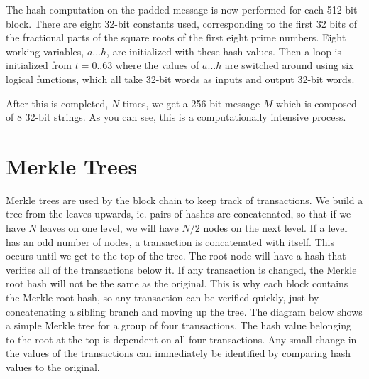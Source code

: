\documentclass[12pt]{article}
\begin{document}
The hash computation on the padded message is now performed for each 512-bit block. There are eight 32-bit constants used, corresponding to the first 32 bits of the fractional parts of the square roots of the first eight prime numbers. Eight working variables, $a...h$, are initialized with these hash values. Then a loop is initialized from $t=0..63$ where the values of $a...h$ are switched around using six logical functions, which all take 32-bit words as inputs and output 32-bit words.

After this is completed, $N$ times, we get a 256-bit message $M$ which is composed of 8 32-bit strings. As you can see, this is a computationally intensive process.

\section{Merkle Trees}
Merkle trees are used by the block chain to keep track of transactions. We build a tree from the leaves upwards, ie. pairs of hashes are concatenated, so that if we have $N$ leaves on one level, we will have $N/2$ nodes on the next level. If a level has an odd number of nodes, a transaction is concatenated with itself. This occurs until we get to the top of the tree. The root node will have a hash that verifies all of the transactions below it. If any transaction is changed, the Merkle root hash will not be the same as the original. This is why each block contains the Merkle root hash, so any transaction can be verified quickly, just by concatenating a sibling branch and moving up the tree. The diagram below shows a simple Merkle tree for a group of four transactions. The hash value belonging to the root at the top is dependent on all four transactions. Any small change in the values of the transactions can immediately be identified by comparing hash values to the original.

\begin{center}
\end{center}
\end{document}
